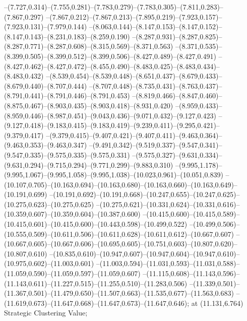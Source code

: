   --(7.727,0.314)--(7.755,0.281)--(7.783,0.279)--(7.783,0.305)--(7.811,0.283)--(7.867,0.297)%
  --(7.867,0.212)--(7.867,0.213)--(7.895,0.219)--(7.923,0.157)--(7.923,0.131)--(7.979,0.144)%
  --(8.063,0.144)--(8.147,0.153)--(8.147,0.152)--(8.147,0.143)--(8.231,0.183)--(8.259,0.190)%
  --(8.287,0.931)--(8.287,0.825)--(8.287,0.771)--(8.287,0.608)--(8.315,0.569)--(8.371,0.563)%
  --(8.371,0.535)--(8.399,0.505)--(8.399,0.512)--(8.399,0.506)--(8.427,0.489)--(8.427,0.491)%
  --(8.427,0.462)--(8.427,0.472)--(8.455,0.490)--(8.483,0.425)--(8.483,0.434)--(8.483,0.432)%
  --(8.539,0.454)--(8.539,0.448)--(8.651,0.437)--(8.679,0.433)--(8.679,0.440)--(8.707,0.444)%
  --(8.707,0.448)--(8.735,0.431)--(8.763,0.437)--(8.791,0.441)--(8.791,0.446)--(8.791,0.453)%
  --(8.819,0.466)--(8.847,0.460)--(8.875,0.467)--(8.903,0.435)--(8.903,0.418)--(8.931,0.420)%
  --(8.959,0.433)--(8.959,0.446)--(8.987,0.451)--(9.043,0.436)--(9.071,0.432)--(9.127,0.423)%
  --(9.127,0.418)--(9.183,0.415)--(9.183,0.419)--(9.239,0.411)--(9.295,0.421)--(9.379,0.417)%
  --(9.379,0.415)--(9.407,0.421)--(9.407,0.411)--(9.463,0.364)--(9.463,0.353)--(9.463,0.347)%
  --(9.491,0.342)--(9.519,0.337)--(9.547,0.341)--(9.547,0.335)--(9.575,0.335)--(9.575,0.331)%
  --(9.575,0.327)--(9.631,0.334)--(9.631,0.294)--(9.715,0.294)--(9.771,0.299)--(9.883,0.310)%
  --(9.995,1.178)--(9.995,1.067)--(9.995,1.058)--(9.995,1.038)--(10.023,0.961)--(10.051,0.839)%
  --(10.107,0.705)--(10.163,0.694)--(10.163,0.680)--(10.163,0.660)--(10.163,0.649)--(10.191,0.699)%
  --(10.191,0.692)--(10.191,0.668)--(10.247,0.655)--(10.247,0.625)--(10.275,0.623)--(10.275,0.625)%
  --(10.275,0.621)--(10.331,0.624)--(10.331,0.616)--(10.359,0.607)--(10.359,0.604)--(10.387,0.600)%
  --(10.415,0.600)--(10.415,0.589)--(10.415,0.601)--(10.415,0.600)--(10.443,0.598)--(10.499,0.522)%
  --(10.499,0.506)--(10.555,0.509)--(10.611,0.506)--(10.611,0.628)--(10.611,0.612)--(10.667,0.607)%
  --(10.667,0.605)--(10.667,0.606)--(10.695,0.605)--(10.751,0.603)--(10.807,0.620)--(10.807,0.610)%
  --(10.835,0.610)--(10.947,0.607)--(10.947,0.604)--(10.947,0.610)--(10.975,0.602)--(11.003,0.601)%
  --(11.003,0.594)--(11.031,0.593)--(11.031,0.588)--(11.059,0.590)--(11.059,0.597)--(11.059,0.607)%
  --(11.115,0.608)--(11.143,0.596)--(11.143,0.611)--(11.227,0.515)--(11.255,0.510)--(11.283,0.506)%
  --(11.339,0.501)--(11.367,0.501)--(11.479,0.650)--(11.507,0.663)--(11.535,0.677)--(11.563,0.683)%
  --(11.619,0.673)--(11.647,0.668)--(11.647,0.673)--(11.647,0.646);
 at (11.131,6.764) {Strategic Clustering Value};
